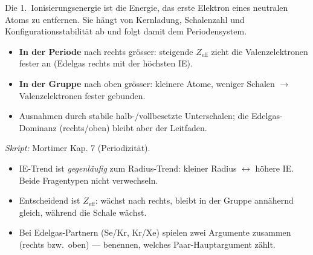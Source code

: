 
Die 1.\ Ionisierungsenergie ist die Energie, das erste Elektron eines
neutralen Atoms zu entfernen. Sie hängt von Kernladung, Schalenzahl und
Konfigurationsstabilität ab und folgt damit dem Periodensystem.

\begin{werkzeugkasten}
\begin{itemize}
  \item \textbf{In der Periode} nach rechts grösser: steigende
        $Z_{\mathrm{eff}}$ zieht die Valenzelektronen fester an (Edelgas rechts
        mit der höchsten IE).
  \item \textbf{In der Gruppe} nach oben grösser: kleinere Atome, weniger
        Schalen $\to$ Valenzelektronen fester gebunden.
  \item Ausnahmen durch stabile halb-/vollbesetzte Unterschalen; die
        Edelgas-Dominanz (rechts/oben) bleibt aber der Leitfaden.
\end{itemize}
\textit{Skript:} Mortimer Kap. 7 (Periodizität).
\end{werkzeugkasten}

\begin{achtung}
\begin{itemize}
  \item IE-Trend ist \textit{gegenläufig} zum Radius-Trend: kleiner Radius
        $\leftrightarrow$ höhere IE. Beide Fragentypen nicht verwechseln.
  \item Entscheidend ist $Z_{\mathrm{eff}}$: wächst nach rechts, bleibt in der
        Gruppe annähernd gleich, während die Schale wächst.
  \item Bei Edelgas-Partnern (Se/Kr, Kr/Xe) spielen zwei Argumente zusammen
        (rechts bzw.\ oben) --- benennen, welches Paar-Hauptargument zählt.
\end{itemize}
\end{achtung}
